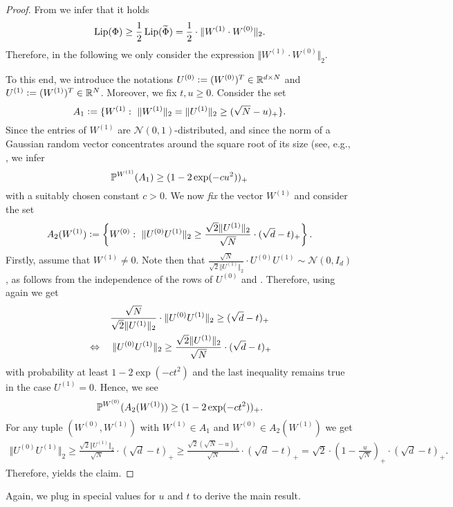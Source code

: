\begin{proof}
From  we infer that it holds
\begin{equation*}
\operatorname{Lip}(\Phi) \geq \frac{1}{2}\operatorname{Lip}(\widetilde{\Phi}) = \frac{1}{2} \cdot \Vert W^{(1)}\cdot W^{(0)} \Vert_2.
\end{equation*}
Therefore, in the following we only consider the expression $\Vert W^{(1)}\cdot W^{(0)} \Vert_2$.

To this end, we introduce the notations $U^{(0)} \mathrel{\mathop:}= (W^{(0)})^T \in \mathbb{R}^{d \times N}$ and $U^{(1)} \mathrel{\mathop:}= (W^{(1)})^T \in \mathbb{R}^{N}$. 
Moreover, we fix $t,u \geq 0$. Consider the set
\begin{equation*}
A_1 \defeq \{W^{(1)}: \ \Vert W^{(1)} \Vert_2 = \Vert U^{(1)} \Vert_2 \geq (\sqrt{N} - u)_+\}.	
\end{equation*} 
Since the entries of $W^{(1)}$ are $\mathcal{N}(0,1)$-distributed, and since the norm of a Gaussian random vector concentrates around the square root of its size (see, e.g., \cite[Theorem~3.1.1~\&~Equation~(2.14)]{vershynin_high-dimensional_2018}, we infer
\begin{equation*}
\mathbb{P}^{W^{(1)}}(A_1) \geq (1 - 2\exp(-cu^2))_+
\end{equation*}
with a suitably chosen constant $c>0$. We now \emph{fix} the vector $W^{(1)}$ and consider the set
\begin{equation*}
A_2 (W^{(1)}) \mathrel{\mathop:}= \left\{W^{(0)}: \ \Vert U^{(0)} U^{(1)}\Vert_2 \geq \frac{\sqrt{2} \Vert U^{(1)} \Vert_2}{\sqrt{N}} \cdot (\sqrt{d}-t)_+\right\}.
\end{equation*}
Firstly, assume that $W^{(1)} \neq 0$. Note then that $\frac{\sqrt{N}}{\sqrt{2} \Vert U^{(1)} \Vert_2} \cdot U^{(0)} U^{(1)} \sim \mathcal{N}(0, I_d)$, as follows from the independence of the rows of $U^{(0)}$ and \cite[Exercise~3.3.3~(a)]{vershynin_high-dimensional_2018}. 
Therefore, using again \cite[Theorem~3.1.1~\&~Equation~(2.14)]{vershynin_high-dimensional_2018} we get
\begin{align*}
&\norel \quad\frac{\sqrt{N}}{\sqrt{2} \Vert U^{(1)} \Vert_2} \cdot \Vert U^{(0)} U^{(1)} \Vert_2 \geq (\sqrt{d} - t)_+ \\
&\Leftrightarrow \quad  \Vert U^{(0)} U^{(1)} \Vert_2 \geq \frac{\sqrt{2} \Vert U^{(1)} \Vert_2}{\sqrt{N}} \cdot (\sqrt{d}-t)_+
\end{align*}
with probability at least $1- 2\exp(-ct^2)$ and the last inequality remains true in the case $U^{(1)}  = 0$. 
Hence, we see
\begin{equation*}
\mathbb{P}^{W^{(0)}} (A_2(W^{(1)})) \geq (1 - 2\exp(-ct^2))_+.
\end{equation*}
For any tuple $(W^{(0)}, W^{(1)})$ with $W^{(1)} \in A_1$ and $W^{(0)} \in A_2(W^{(1)})$ we get
\begin{align*}
\Vert U^{(0)} U^{(1)}\Vert_2 \geq \frac{\sqrt{2} \Vert U^{(1)} \Vert_2}{\sqrt{N}} \cdot (\sqrt{d}-t)_+ \geq \frac{\sqrt{2} (\sqrt{N}-u)_+}{\sqrt{N}} \cdot (\sqrt{d}-t)_+ = \sqrt{2} \cdot \left(1 - \frac{u}{\sqrt{N}}\right)_+ \cdot (\sqrt{d} - t)_+.
\end{align*}
Therefore,  yields the claim.
\end{proof}
Again, we plug in special values for $u$ and $t$ to derive the main result.

